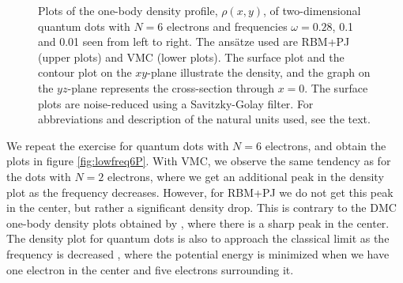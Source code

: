 \begin{figure}
	\hspace{0.1cm}
	\hspace{-0.cm}
	\hspace{-0.cm}
	
	\caption{Plots of the one-body density profile, $\rho(x, y)$, of two-dimensional quantum dots with $N=6$ electrons and frequencies $\omega=0.28$, 0.1 and 0.01 seen from left to right. The ansätze used are RBM+PJ (upper plots) and VMC (lower plots). The surface plot and the contour plot on the $xy$-plane illustrate the density, and the graph on the $yz$-plane represents the cross-section through $x=0$. The surface plots are noise-reduced using a Savitzky-Golay filter. For  abbreviations and description of the natural units used, see the text.}
	\label{fig:lowfreq6P}
\end{figure}

We repeat the exercise for quantum dots with $N=6$ electrons, and obtain the plots in figure \eqref{fig:lowfreq6P}. With VMC, we observe the same tendency as for the dots with $N=2$ electrons, where we get an additional peak in the density plot as the frequency decreases. However, for RBM+PJ we do not get this peak in the center, but rather a significant density drop. This is contrary to the DMC one-body density plots obtained by \citet{hogberget_quantum_2013}, where there is a sharp peak in the center. The density plot for quantum dots is also to approach the classical limit as the frequency is decreased \supercite{ghosal_incipient_2007}, where the potential energy is minimized when we have one electron in the center and five electrons surrounding it.

